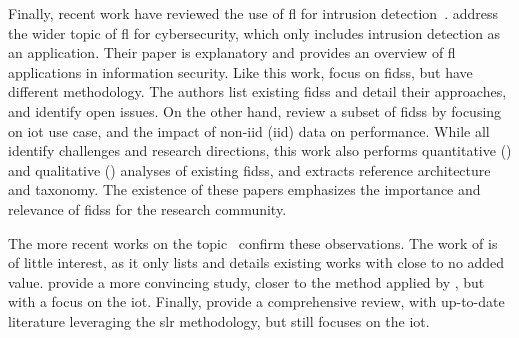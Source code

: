 Finally, recent work have reviewed the use of \gls{fl} for intrusion
detection~\cite{agrawal_FederatedLearningIntrusion_2021,campos_EvaluatingFederatedLearning_2022,alazab_FederatedLearningCybersecurity_2021}.
\textcite{alazab_FederatedLearningCybersecurity_2021} address the wider topic of
\gls{fl} for cybersecurity, which only includes intrusion detection as an application.
Their paper
is explanatory and provides an overview of \gls{fl} applications in information security.
Like this
work, \textcite{agrawal_FederatedLearningIntrusion_2021} focus on \glspl{fids}, but have different methodology.
The authors list
existing \glspl{fids} and detail their approaches, and identify open issues.
On the other hand,
\textcite{campos_EvaluatingFederatedLearning_2022} review a subset of \glspl{fids} by focusing on \gls{iot} use case, and the
impact of non-\acrshort{iid} (\acrlong{iid}) data on performance.
While all identify challenges and
research directions, this work also performs quantitative () and
qualitative () analyses of existing \glspl{fids}, and extracts reference
architecture and taxonomy.
The existence of these papers emphasizes the importance and relevance of
\glspl{fids} for the research community.

The more recent works on the topic~\cite{fedorchenko_ComparativeReviewIntrusion_2022, ghimire_RecentAdvancesFederated_2022, ismaila_ReviewApproachesFederated_2024} confirm these observations.
The work of \citeauthor{fedorchenko_ComparativeReviewIntrusion_2022} is of little interest, as it only lists and details existing works with close to no added value.
\textcite{ghimire_RecentAdvancesFederated_2022} provide a more convincing study, closer to the method applied by \textcite{alazab_FederatedLearningCybersecurity_2021}, but with a focus on the \gls{iot}.
Finally, \textcite{ismaila_ReviewApproachesFederated_2024} provide a comprehensive review, with up-to-date literature leveraging the \gls{slr} methodology, but still focuses on the \gls{iot}.
